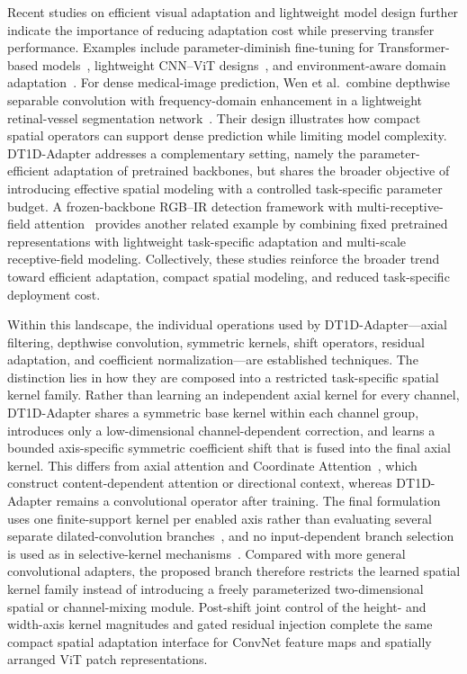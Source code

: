 \documentclass[pdflatex,sn-mathphys-num]{sn-jnl}
\theoremstyle{thmstyleone}
\theoremstyle{thmstyletwo}
\theoremstyle{thmstylethree}
\begin{document}
Recent studies on efficient visual adaptation and lightweight model design further indicate the importance of reducing adaptation cost while preserving transfer performance. Examples include parameter-diminish fine-tuning for Transformer-based models~\cite{zhang2025pdft}, lightweight CNN--ViT designs~\cite{zhang2025lightweightcnnvit}, and environment-aware domain adaptation~\cite{zhu2024ceal}. 
For dense medical-image prediction, Wen et al.\ combine depthwise separable convolution with frequency-domain enhancement in a lightweight retinal-vessel segmentation network~\cite{wen2025retinalvessel}. Their design illustrates how compact spatial operators can support dense prediction while limiting model complexity. DT1D-Adapter addresses a complementary setting, namely the parameter-efficient adaptation of pretrained backbones, but shares the broader objective of introducing effective spatial modeling with a controlled task-specific parameter budget. A frozen-backbone RGB--IR detection framework with multi-receptive-field attention~\cite{lu2026frozenrgbir} provides another related example by combining fixed pretrained representations with lightweight task-specific adaptation and multi-scale receptive-field modeling. 
Collectively, these studies reinforce the broader trend toward efficient adaptation, compact spatial modeling, and reduced task-specific deployment cost.

Within this landscape, the individual operations used by DT1D-Adapter---axial filtering, depthwise convolution, symmetric kernels, shift operators, residual adaptation, and coefficient normalization---are established techniques. The distinction lies in how they are composed into a restricted task-specific spatial kernel family. Rather than learning an independent axial kernel for every channel, DT1D-Adapter shares a symmetric base kernel within each channel group, introduces only a low-dimensional channel-dependent correction, and learns a bounded axis-specific symmetric coefficient shift that is fused into the final axial kernel. This differs from axial attention and Coordinate Attention~\cite{ho2019axialattention,hou2021coordinateattention}, which construct content-dependent attention or directional context, whereas DT1D-Adapter remains a convolutional operator after training. The final formulation uses one finite-support kernel per enabled axis rather than evaluating several separate dilated-convolution branches~\cite{yu2016dilated}, and no input-dependent branch selection is used as in selective-kernel mechanisms~\cite{li2019sknet}. Compared with more general convolutional adapters, the proposed branch therefore restricts the learned spatial kernel family instead of introducing a freely parameterized two-dimensional spatial or channel-mixing module. Post-shift joint control of the height- and width-axis kernel magnitudes and gated residual injection complete the same compact spatial adaptation interface for ConvNet feature maps and spatially arranged ViT patch representations.
\end{document}
